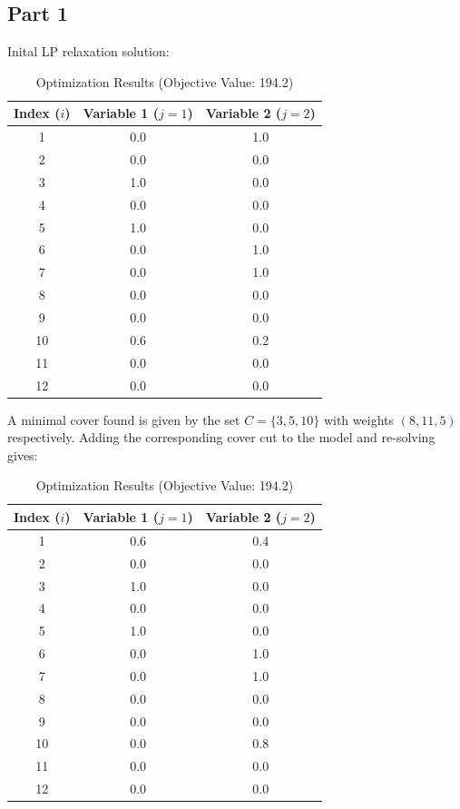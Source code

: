 \documentclass{article}
\begin{document}
    \subsection*{Part 1}
    Inital LP relaxation solution:
    \begin{table}[H]
        \centering
        \caption{Optimization Results (Objective Value: 194.2)}
        \label{tab:optimization_results}
        \begin{tabular}{ccc}
            \toprule
            \textbf{Index ($i$)} & \textbf{Variable 1 ($j=1$)} & \textbf{Variable 2 ($j=2$)} \\
            \midrule
            1  & 0.0 & 1.0 \\
            2  & 0.0 & 0.0 \\
            3  & 1.0 & 0.0 \\
            4  & 0.0 & 0.0 \\
            5  & 1.0 & 0.0 \\
            6  & 0.0 & 1.0 \\
            7  & 0.0 & 1.0 \\
            8  & 0.0 & 0.0 \\
            9  & 0.0 & 0.0 \\
            10 & 0.6 & 0.2 \\
            11 & 0.0 & 0.0 \\
            12 & 0.0 & 0.0 \\
            \bottomrule
        \end{tabular}
    \end{table}
    A minimal cover found is given by the set $C = \{3,5,10\}$ with weights $(8,11,5)$ respectively.
    Adding the corresponding cover cut to the model and re-solving gives:
    \begin{table}[H]
        \centering
        \caption{Optimization Results (Objective Value: 194.2)}
        \label{tab:optimization_results_2}
        \begin{tabular}{ccc}
            \toprule
            \textbf{Index ($i$)} & \textbf{Variable 1 ($j=1$)} & \textbf{Variable 2 ($j=2$)} \\
            \midrule
            1  & 0.6 & 0.4 \\
            2  & 0.0 & 0.0 \\
            3  & 1.0 & 0.0 \\
            4  & 0.0 & 0.0 \\
            5  & 1.0 & 0.0 \\
            6  & 0.0 & 1.0 \\
            7  & 0.0 & 1.0 \\
            8  & 0.0 & 0.0 \\
            9  & 0.0 & 0.0 \\
            10 & 0.0 & 0.8 \\
            11 & 0.0 & 0.0 \\
            12 & 0.0 & 0.0 \\
            \bottomrule
        \end{tabular}
    \end{table}
\end{document}
